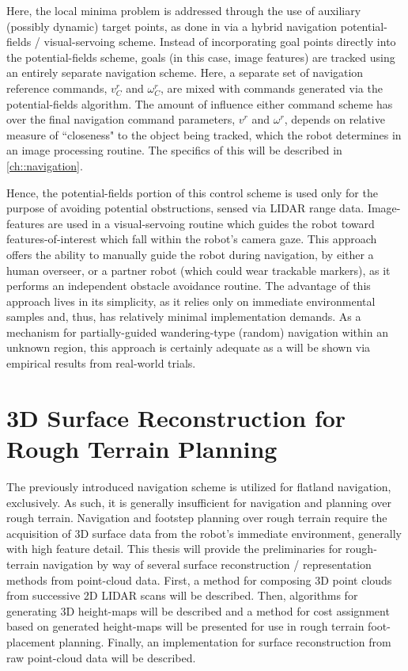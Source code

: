 		Here, the local minima problem is addressed through the use of auxiliary (possibly dynamic) target points, as done in \cite{ArambulaCosio2004} via a hybrid navigation potential-fields / visual-servoing scheme. Instead of incorporating goal points directly into the potential-fields scheme, goals (in this case, image features) are tracked using an entirely separate navigation scheme. Here, a separate set of navigation reference commands, $v^{r}_{C}$ and $\omega^{r}_{C}$, are mixed with commands generated via the potential-fields algorithm. The amount of influence either command scheme has over the final navigation command parameters, $v^{r}$ and $\omega^{r}$, depends on relative measure of ``closeness" to the object being tracked, which the robot determines in an image processing routine. The specifics of this will be described in \ref{ch::navigation}. 

		Hence, the potential-fields portion of this control scheme is used only for the purpose of avoiding potential obstructions, sensed via LIDAR range data. Image-features are used in a visual-servoing routine which guides the robot toward features-of-interest which fall within the robot’s camera gaze. This approach offers the ability to manually guide the robot during navigation, by either a human overseer, or a partner robot (which could wear trackable markers), as it performs an independent obstacle avoidance routine. The advantage of this approach lives in its simplicity, as it relies only on immediate environmental samples and, thus, has relatively minimal implementation demands.  As a mechanism for partially-guided wandering-type (random) navigation within an unknown region, this approach is certainly adequate as a will be shown via empirical results from real-world trials.




	\section{3D Surface Reconstruction for Rough Terrain Planning}

		The previously introduced navigation scheme is utilized for flatland navigation, exclusively. As such, it is generally insufficient for navigation and planning over rough terrain. Navigation and footstep planning over rough terrain require the acquisition of 3D surface data from the robot’s immediate environment, generally with high feature detail. This thesis will provide the preliminaries for rough-terrain navigation by way of several surface reconstruction / representation methods from point-cloud data. First, a method for composing 3D point clouds from successive 2D LIDAR scans will be described. Then, algorithms for generating 3D height-maps will be described and a method for cost assignment based on generated height-maps will be presented for use in rough terrain foot-placement planning. Finally, an implementation for surface reconstruction from raw point-cloud data will be described.

